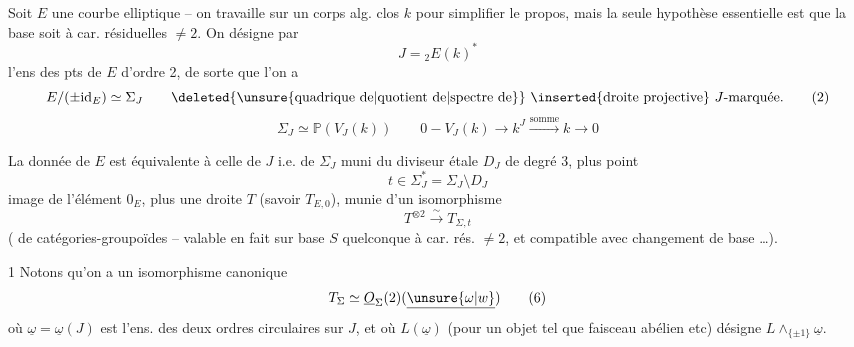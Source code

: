 Soit $E$ une courbe elliptique -- on travaille sur un corps alg. clos $k$ pour simplifier le propos, mais la seule hypothèse essentielle est que la base soit à car. résiduelles $\ne2$. On désigne par 
\[
J={}_2E(k)^\ast \tag*{(1)}
\]
l'ens des pts de $E$ d'ordre 2, de sorte que l'on a
\[
E/(\pm\mathrm{id}_E)\simeq\Sigma_J\qquad
\text{\deleted{\unsure{quadrique de|quotient de|spectre de}} \inserted{droite projective} $J$-marquée.} \tag*{(2)}
\]
\[
\Sigma_J\simeq\mathbb P(V_J(k))\qquad
0\mathbin{-} V_J(k)\to k^J\xrightarrow{\mathrm{somme}} k\to 0 \tag*{(3)}
\]

La donnée de $E$ est équivalente à celle de $J$ i.e. de $\Sigma_J$ muni du diviseur étale $D_J$ de degré 3, plus  point
\[
t\in\Sigma_J^\ast=\Sigma_J\setminus D_J \tag*{(4)}
\]
image de l'élément $0_E$, plus une droite $T$  (savoir $T_{E,0}$), munie d'un isomorphisme
\[
T^{\otimes2}\xrightarrow{\sim}T_{\Sigma,t} \tag*{(5)}
\]
(  de catégories-groupoïdes -- valable en fait sur base $S$ quelconque à car. rés. $\ne2$, et compatible avec changement de base \ldots).

1 \quad Notons qu'on a un isomorphisme canonique
\[
T_\Sigma\simeq\underline O_\Sigma(2)(\underline{\unsure{\omega|w}}) \tag*{(6)}
\]
où $\underline\omega=\underline\omega(J)$ est l'ens. des deux ordres circulaires sur $J$, et où $L(\underline\omega)$ (pour un objet tel que faisceau abélien etc) désigne $L\wedge_{\{\pm1\}}\underline\omega$.
